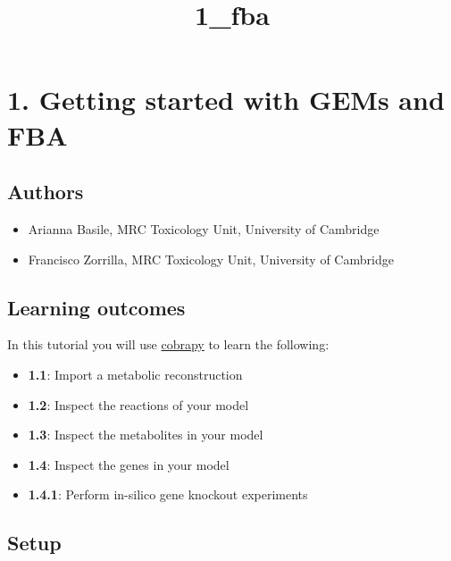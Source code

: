 \documentclass[11pt]{article}
\title{1\_fba}
\providecommand{\tightlist}{%
      \setlength{\itemsep}{0pt}\setlength{\parskip}{0pt}}
\begin{document}
    
    \maketitle
    
    

    
    \hypertarget{getting-started-with-gems-and-fba}{%
\section{1. Getting started with GEMs and
FBA}\label{getting-started-with-gems-and-fba}}

    \hypertarget{authors}{%
\subsection{Authors}\label{authors}}

\begin{itemize}
\tightlist
\item
  Arianna Basile, MRC Toxicology Unit, University of Cambridge
\item
  Francisco Zorrilla, MRC Toxicology Unit, University of Cambridge
\end{itemize}

    \hypertarget{learning-outcomes}{%
\subsection{Learning outcomes}\label{learning-outcomes}}

In this tutorial you will use
\href{https://cobrapy.readthedocs.io/en/latest/}{cobrapy} to learn the
following:

\begin{itemize}
\tightlist
\item
  \textbf{1.1}: Import a metabolic reconstruction
\item
  \textbf{1.2}: Inspect the reactions of your model
\item
  \textbf{1.3}: Inspect the metabolites in your model
\item
  \textbf{1.4}: Inspect the genes in your model
\item
  \textbf{1.4.1}: Perform in-silico gene knockout experiments
\end{itemize}

\hypertarget{setup}{%
\subsection{Setup}\label{setup}}
\end{document}
